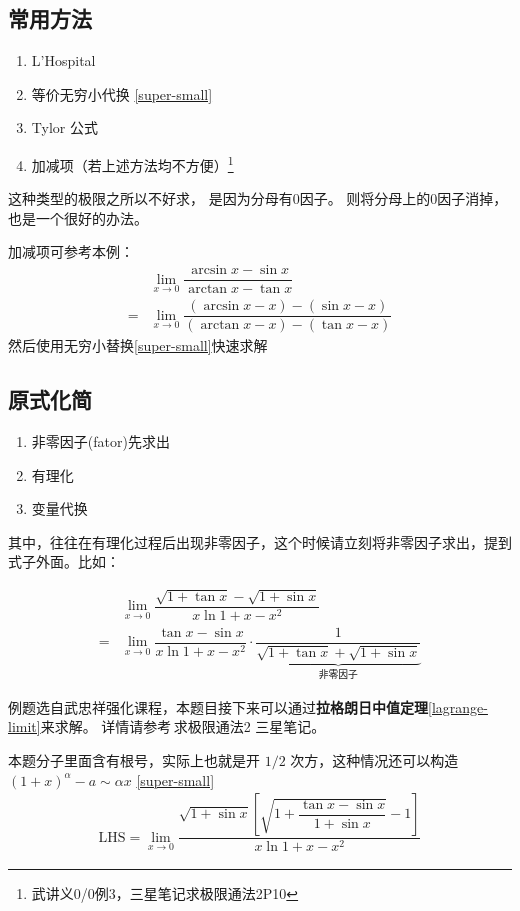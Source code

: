 \subsection{常用方法}
\begin{enumerate}
	\item L'Hospital
	\item 等价无穷小代换 \ref{super-small}
	\item Tylor 公式
	\item 加减项（若上述方法均不方便）\footnote{武讲义0/0例3，三星笔记求极限通法2P10}
\end{enumerate}

这种类型的极限之所以不好求，
是因为分母有0因子。
则将分母上的0因子消掉，也是一个很好的办法。

加减项可参考本例：
\begin{align*}
	&\lim_{x \to 0} \dfrac{\arcsin{x} - \sin{x}}{\arctan{x} - \tan{x}} \\
	= &\lim_{x \to 0} \dfrac{(\arcsin{x} -x) - (\sin{x}-x)}{(\arctan{x}-x) - (\tan{x}-x)}
\end{align*}
然后使用无穷小替换\ref{super-small}快速求解

\subsection{原式化简}
\begin{enumerate}
	\item 非零因子(fator)先求出 \label{non-zero-factor}
	\item 有理化
	\item 变量代换
\end{enumerate}

其中，往往在有理化过程后出现非零因子，这个时候请立刻将非零因子求出，提到式子外面。比如：

\begin{align*}
	&\lim_{x \to 0} \dfrac{\sqrt{1+\tan{x}} - \sqrt{1+\sin{x}}}{x \ln{1+x} - x^2} \\
	=&\lim_{x \to 0} \dfrac{\tan{x} - \sin{x}}{x \ln{1+x} - x^2} \cdot
	\underbrace{\dfrac{1}{\sqrt{1+\tan{x}} + \sqrt{1+\sin{x}}}}_{\mbox{非零因子}}
\end{align*}

例题选自武忠祥强化课程，本题目接下来可以通过\textbf{拉格朗日中值定理}\ref{lagrange-limit}来求解。
详情请参考\,求极限通法2 三星笔记。

本题分子里面含有根号，实际上也就是开 $1/2$ 次方，这种情况还可以构造
$(1+x)^\alpha - a \sim \alpha x$
\ref{super-small}
\begin{equation*}
	\begin{array}{l}
		\mbox{LHS} = \lim_{x \to 0}
		\dfrac{\sqrt{1+\sin{x}}\left[ 
			\sqrt{1+\dfrac{\tan{x}-\sin{x}}{1+\sin{x}}}	- 1
			\right] }{x \ln{1+x} - x^2}
	\end{array}
\end{equation*}

